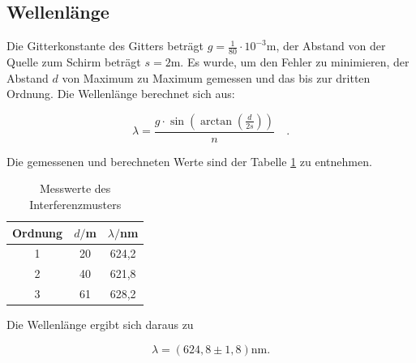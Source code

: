 \subsection{Wellenlänge}
Die Gitterkonstante des Gitters beträgt \(g=\frac{1}{80}\cdot10^{-3}\text{m}\), der Abstand von der Quelle zum Schirm beträgt \(s=2\text{m}\). Es wurde, um den Fehler zu minimieren, der Abstand \(d\) von Maximum zu Maximum gemessen und das bis zur dritten Ordnung. Die Wellenlänge berechnet sich aus:

\begin{equation}
\lambda=\frac{g\cdot\sin{\left(\arctan{\left(\frac{d}{2s}\right)}\right)}}{n}\quad.
\end{equation}

\noindent Die gemessenen und berechneten Werte sind der Tabelle \ref{tab:t3} zu entnehmen.

\begin{table}[H]
	\begin{center}
		\begin{tabular}{c c c}
			\toprule
			Ordnung & \(d/\)m & \(\lambda/\)nm \\
			\midrule
			1 & 20 & 624,2\\
			2 & 40 & 621,8\\
			3 & 61 & 628,2\\
			\bottomrule
		\end{tabular}
		\caption{Messwerte des Interferenzmusters}
		\label{tab:t3}
	\end{center}
\end{table}

\noindent Die Wellenlänge ergibt sich daraus zu

\begin{equation*}
\lambda=(624,8\pm1,8)\text{nm}.
\end{equation*}